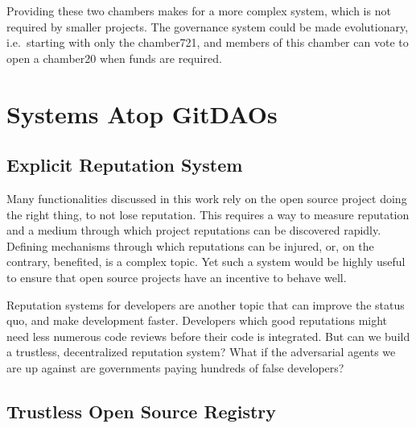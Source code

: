 Providing these two chambers makes for a more complex system, which is not required by smaller projects.
The governance system could be made evolutionary, i.e.\ starting with only the chamber721, and members of this chamber can vote to open a chamber20 when funds are required.

\section{Systems Atop GitDAOs}

\subsection{Explicit Reputation System}

Many functionalities discussed in this work rely on the open source project doing the right thing, to not lose reputation.
This requires a way to measure reputation and a medium through which project reputations can be discovered rapidly.
Defining mechanisms through which reputations can be injured, or, on the contrary, benefited, is a complex topic.
Yet such a system would be highly useful to ensure that open source projects have an incentive to behave well.

Reputation systems for developers are another topic that can improve the status quo, and make development faster.
Developers which good reputations might need less numerous code reviews before their code is integrated.
But can we build a trustless, decentralized reputation system?
What if the adversarial agents we are up against are governments paying hundreds of false developers?

\subsection{Trustless Open Source Registry}

